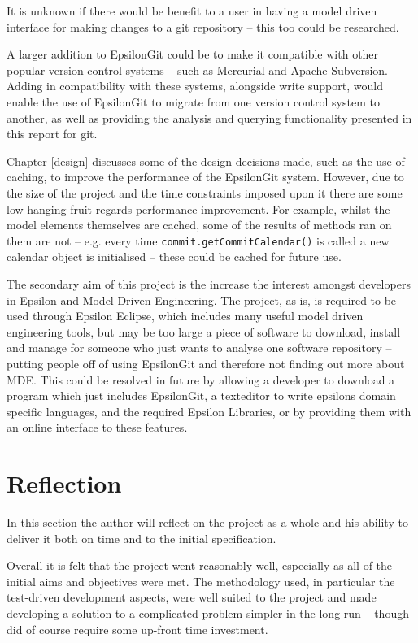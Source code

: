 \documentclass[11pt]{book}
\newcommand{\code}[1]{\texttt{#1}}
\begin{document}
It is unknown if there would be benefit to a user in having a model driven interface for making changes to a git repository -- this too could be researched. 

A larger addition to EpsilonGit could be to make it compatible with other popular version control systems -- such as Mercurial and Apache Subversion. Adding in compatibility with these systems, alongside write support, would enable the use of EpsilonGit to migrate from one version control system to another, as well as providing the analysis and querying functionality presented in this report for git.

Chapter \ref{design} discusses some of the design decisions made, such as the use of caching, to improve the performance of the EpsilonGit system. However, due to the size of the project and the time constraints imposed upon it there are some low hanging fruit regards performance improvement. For example, whilst the model elements themselves are cached, some of the results of methods ran on them are not -- e.g. every time \code{commit.getCommitCalendar()} is called a new calendar object is initialised -- these could be cached for future use.

The secondary aim of this project is the increase the interest amongst developers in Epsilon and Model Driven Engineering. The project, as is, is required to be used through Epsilon Eclipse, which includes many useful model driven engineering tools, but may be too large a piece of software to download, install and manage for someone who just wants to analyse one software repository -- putting people off of using EpsilonGit and therefore not finding out more about MDE. This could be resolved in future by allowing a developer to download a program which just includes EpsilonGit, a texteditor to write epsilons domain specific languages, and the required Epsilon Libraries, or by providing them with an online interface to these features.

\section{Reflection}
In this section the author will reflect on the project as a whole and his ability to deliver it both on time and to the initial specification.

Overall it is felt that the project went reasonably well, especially as all of the initial aims and objectives were met. The methodology used, in particular the test-driven development aspects, were well suited to the project and made developing a solution to a complicated problem simpler in the long-run -- though did of course require some up-front time investment.
\end{document}

